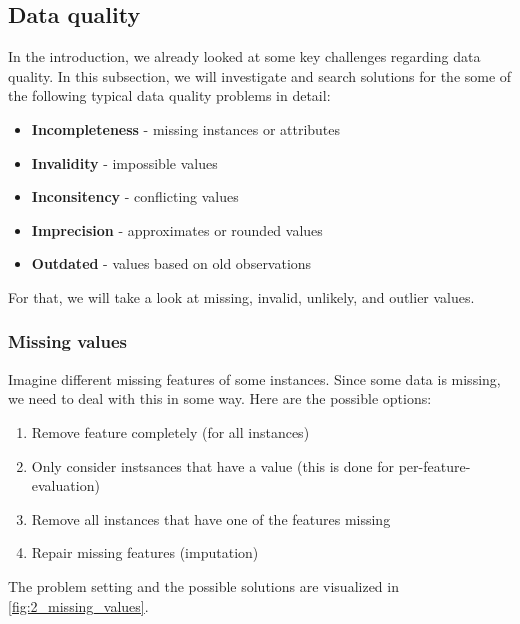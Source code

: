 \subsection{Data quality}

In the introduction, we already looked at some key challenges regarding data quality. In this subsection, we will investigate and search solutions for the some of the following typical data quality problems in detail:
\begin{itemize}
  \item \textbf{Incompleteness} - missing instances or attributes
  \item \textbf{Invalidity} - impossible values
  \item \textbf{Inconsitency} - conflicting values
  \item \textbf{Imprecision} - approximates or rounded values
  \item \textbf{Outdated} - values based on old observations
\end{itemize}

For that, we will take a look at missing, invalid, unlikely, and outlier values.

\subsubsection*{Missing values}
Imagine different missing features of some instances. Since some data is missing, we need to deal with this in some way. Here are the possible options:
\begin{enumerate}
  \item Remove feature completely (for all instances)
  \item Only consider instsances that have a value (this is done for per-feature-evaluation)
  \item Remove all instances that have one of the features missing
  \item Repair missing features (imputation)
\end{enumerate}

The problem setting and the possible solutions are visualized in \ref{fig:2_missing_values}.

